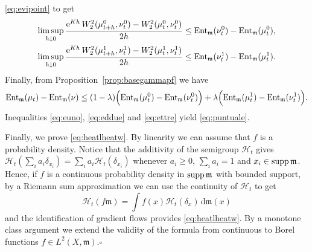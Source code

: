\documentclass[reqno,11pt]{article}
\numberwithin{equation}{section}
\newcommand{\mm}{{\mbox{\boldmath$m$}}}
\newcommand{\rme}{{\mathrm e}}
\newcommand{\supp}{\mathop{\rm supp}\nolimits}   %
\renewcommand{\d}{{\mathrm d}}
\newenvironment{proof}{\removelastskip\par\medskip   %
\noindent{\em Proof.}
\rm}{\penalty-20\null\hfill$\square$\par\medbreak}
\newcommand{\entr}[2]{{\rm Ent}_{#2}(#1)}              %
\newcommand{\heatw}{{\mathscr H}}
\renewcommand{\mm}{\mathfrak m}
\begin{document}
\begin{proof}
\eqref{eq:evipoint} to get
\begin{equation}
\label{eq:eddue}
\begin{split}
\limsup_{h\downarrow0}\frac{\rme^{Kh}\,
W_2^2(\mu^0_{t+h},\nu^0_t)-W_2^2(\mu^0_t,\nu^0_t)}{2h}
&\leq \entr{\nu^0_t}\mm-\entr{\mu^0_t}\mm,\\
\limsup_{h\downarrow0}\frac{\rme^{Kh}\,
W_2^2(\mu^1_{t+h},\nu^1_t)-W_2^2(\mu^1_t,\nu^1_t)}{2h} &\leq
\entr{\nu^1_t}\mm-\entr{\mu^1_t}\mm.
\end{split}
\end{equation}
Finally, from Proposition~\ref{prop:basegammapf} we have
\begin{equation}
\label{eq:ettre}
\entr{\mu_t}\mm-\entr\nu\mm\leq(1-\lambda)\Big(\entr{\mu^0_t}\mm-\entr{\nu^0_t}\mm\Big)
+\lambda\Big(\entr{\mu^1_t}\mm-\entr{\nu^1_t}\mm\Big).
\end{equation}
Inequalities \eqref{eq:euno}, \eqref{eq:eddue} and \eqref{eq:ettre} yield \eqref{eq:puntuale}.

Finally, we prove \eqref{eq:heatlheatw}. By linearity we can assume
that $f$ is a probability density. Notice that the additivity of the
semigroup $\heatw_t$ gives
$\heatw_t(\sum_ia_i\delta_{x_i})=\sum_ia_i\heatw_t(\delta_{x_i})$
whenever $a_i\geq 0$, $\sum_i a_i=1$ and $x_i\in\supp\mm$. Hence, if
$f$ is a continuous probability density in $\supp\mm$ with bounded
support, by a Riemann sum approximation we can use the continuity of
$\heatw_t$ to get
$$
\heatw_t(f\mm)=\int f(x)\heatw_t(\delta_x)\,\d\mm(x)
$$
and the identification of gradient flows provides
\eqref{eq:heatlheatw}. By a monotone class argument we extend the
validity of the formula from continuous to Borel functions $f\in
L^2(X,\mm)$.\end{proof}
\end{document}
